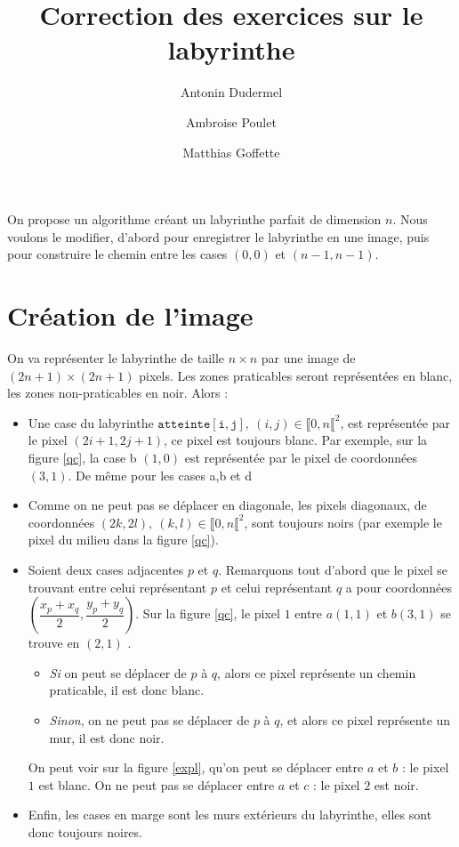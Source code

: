 \documentclass[11pt,a4paper]{article}
\title{Correction des exercices sur le labyrinthe}
\date{}
\author{Antonin Dudermel \and Ambroise Poulet \and Matthias Goffette}
\begin{document}

\maketitle

\begin{it}
On propose un algorithme créant un labyrinthe parfait de dimension $n$. Nous voulons le modifier, d'abord pour enregistrer le labyrinthe en une image, puis pour construire le chemin entre les cases $(0,0)$ et $(n-1,n-1)$.
\end{it}

\section{Création de l'image}

On va représenter le labyrinthe de taille $n\times n$ par une image de $(2n+1)\times (2n+1)$ pixels. Les zones praticables seront représentées en blanc, les zones non-praticables en noir. Alors :
\begin{itemize}
	\item Une case du labyrinthe $\mathtt{atteinte[i,j]}, ~ (i,j) \in \llbracket 0,n \llbracket ^2$, est représentée par le pixel $(2i+1,2j+1)$, ce pixel est toujours blanc. Par exemple, sur la figure \ref{qc}, la case b $(1,0)$ est représentée par le pixel de coordonnées $(3,1)$. De même pour les cases a,b et d
	\item Comme on ne peut pas se déplacer en diagonale, les pixels diagonaux, de coordonnées $(2k,2l), ~ (k,l) \in \llbracket 0,n \llbracket ^2 $, sont toujours noirs (par exemple le pixel du milieu dans la figure \ref{qc}).
	\item 
		Soient deux cases adjacentes $p$ et $q$. Remarquons tout d'abord que le pixel se trouvant entre celui représentant $p$ et celui représentant $q$ a pour coordonnées $(\dfrac{x_p+x_q}{2},\dfrac{y_p+y_q}{2})$. Sur la figure \ref{qc}, le pixel $1$ entre $a(1,1)$ et $b(3,1)$ se trouve en $(2,1)$ .
	\begin{itemize}
		\item {\itshape Si} on peut se déplacer de $p$ à $q$, alors ce pixel représente un chemin praticable, il est donc blanc.
		\item {\itshape Sinon}, on ne peut pas se déplacer de $p$ à $q$, et alors ce pixel représente un mur, il est donc noir.
	\end{itemize}
	On peut voir sur la figure \ref{expl}, qu'on peut se déplacer entre $a$ et $b$ : le pixel $1$ est blanc. On ne peut pas se déplacer entre $a$ et $c$ : le pixel $2$ est noir.
	\item Enfin, les cases en marge sont les murs extérieurs du labyrinthe, elles sont donc toujours noires.
\end{itemize}
\end{document}
